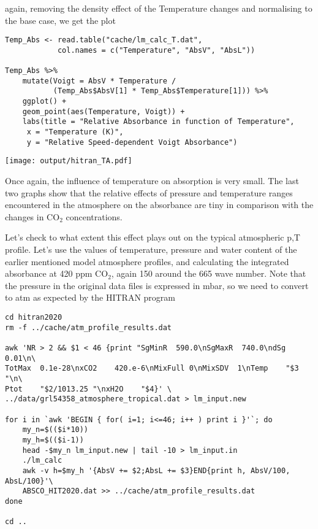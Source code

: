 \documentclass[10pt,a4paper,titlepage]{article}
\begin{document}
again, removing the density effect of the Temperature changes and
normalising to the base case, we get the plot
\begin{lstlisting}
Temp_Abs <- read.table("cache/lm_calc_T.dat",
			col.names = c("Temperature", "AbsV", "AbsL"))

Temp_Abs %>%
    mutate(Voigt = AbsV * Temperature /
	       (Temp_Abs$AbsV[1] * Temp_Abs$Temperature[1])) %>%
    ggplot() +
    geom_point(aes(Temperature, Voigt)) +
    labs(title = "Relative Absorbance in function of Temperature",
	 x = "Temperature (K)",
	 y = "Relative Speed-dependent Voigt Absorbance")
\end{lstlisting}

\texttt{[image: output/hitran\_TA.pdf]}

Once again, the influence of temperature on absorption is very
small. The last two graphs show that the relative effects of pressure
and temperature ranges encountered in the atmosphere on the absorbance
are tiny in comparison with the changes in CO$_{\text{2}}$ concentrations.

Let's check to what extent this effect plays out on the typical
atmospheric p,T profile.  Let's use the values of temperature,
pressure and water content of the earlier mentioned model atmosphere
profiles, and calculating the integrated absorbance at 420 ppm CO$_{\text{2}}$,
again \unit{150}{\centi\reciprocal\metre} around the
\unit{665}{\centi\reciprocal\metre} wave number. Note that the
pressure in the original data files is expressed in mbar, so we need
to convert to atm as expected by the HITRAN program

\begin{lstlisting}
cd hitran2020
rm -f ../cache/atm_profile_results.dat

awk 'NR > 2 && $1 < 46 {print "SgMinR  590.0\nSgMaxR  740.0\ndSg     0.01\n\
TotMax  0.1e-28\nxCO2    420.e-6\nMixFull 0\nMixSDV  1\nTemp    "$3 "\n\
Ptot    "$2/1013.25 "\nxH2O    "$4}' \
../data/grl54358_atmosphere_tropical.dat > lm_input.new

for i in `awk 'BEGIN { for( i=1; i<=46; i++ ) print i }'`; do
    my_n=$(($i*10))
    my_h=$(($i-1))
    head -$my_n lm_input.new | tail -10 > lm_input.in
    ./lm_calc
    awk -v h=$my_h '{AbsV += $2;AbsL += $3}END{print h, AbsV/100, AbsL/100}'\
	ABSCO_HIT2020.dat >> ../cache/atm_profile_results.dat 
done

cd ..
\end{lstlisting}
\end{document}
